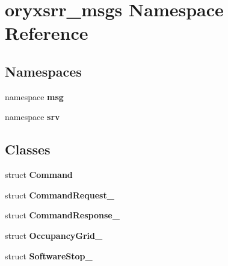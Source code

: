 \section{oryxsrr\-\_\-msgs \-Namespace \-Reference}
\label{namespaceoryxsrr__msgs}
\subsection*{\-Namespaces}
\begin{DoxyCompactItemize}
\item 
namespace {\bf msg}
\item 
namespace {\bf srv}
\end{DoxyCompactItemize}
\subsection*{\-Classes}
\begin{DoxyCompactItemize}
\item 
struct {\bf \-Command}
\item 
struct {\bf \-Command\-Request\-\_\-}
\item 
struct {\bf \-Command\-Response\-\_\-}
\item 
struct {\bf \-Occupancy\-Grid\-\_\-}
\item 
struct {\bf \-Software\-Stop\-\_\-}
\end{DoxyCompactItemize}
